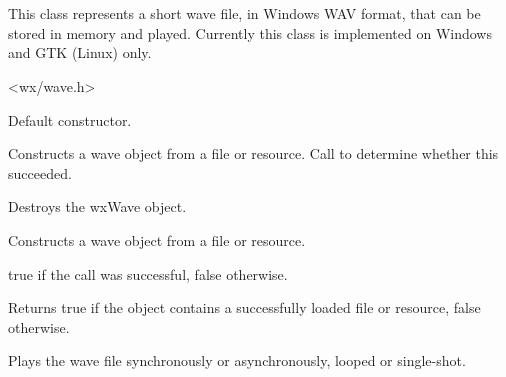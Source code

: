 \section{}\label{wxwave}

This class represents a short wave file, in Windows WAV format, that
can be stored in memory and played. Currently this class is implemented
on Windows and GTK (Linux) only.




<wx/wave.h>


\label{wxwaveconstr}


Default constructor.


Constructs a wave object from a file or resource. Call  to
determine whether this succeeded.






Destroys the wxWave object.

\label{wxwavecreate}


Constructs a wave object from a file or resource.





true if the call was successful, false otherwise.

\label{wxwaveisok}


Returns true if the object contains a successfully loaded file or resource, false otherwise.

\label{wxwaveplay}


Plays the wave file synchronously or asynchronously, looped or single-shot.


